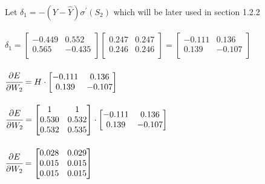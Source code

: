 \documentclass{article}
\begin{document}
\\Let $ \delta_1 = -(Y - \hat{Y})\sigma^\prime(S_2)$ which will be later used in
section 1.2.2\\
\\ $  \delta_1 =
\begin{bmatrix}
-0.449 & 0.552\\
0.565 & -0.435 \\
\end{bmatrix}
\begin{bmatrix}
0.247 & 0.247 \\
0.246 & 0.246 \\
\end{bmatrix} =
\begin{bmatrix}
-0.111 & 0.136 \\
0.139 & -0.107 \\
\end{bmatrix}$\\
\\$\cfrac{\partial E}{\partial W_2} = H \cdot
\begin{bmatrix}
-0.111 & 0.136 \\
0.139 & -0.107 \\
\end{bmatrix}$\\
\\$\cfrac{\partial E}{\partial W_2} =
\begin{bmatrix}
1 & 1 \\
0.530 & 0.532 \\
0.532 & 0.535 \\
\end{bmatrix} \cdot
\begin{bmatrix}
-0.111 & 0.136 \\
0.139 & -0.107 \\
\end{bmatrix}$\\
\\$\cfrac{\partial E}{\partial W_2} =
\begin{bmatrix}
0.028 & 0.029 \\
0.015 & 0.015 \\
0.015 & 0.015 \\
\end{bmatrix}$\\
\end{document}
